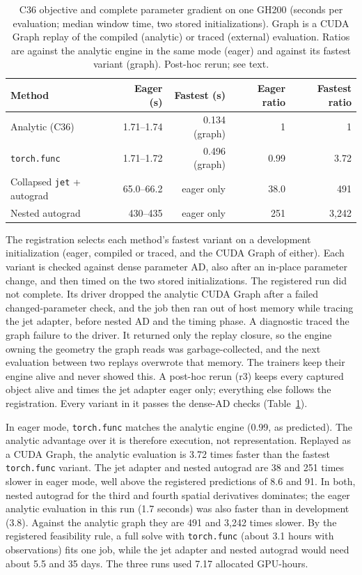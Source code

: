 \documentclass[11pt]{article}
\begin{document}
\begin{table}[htbp]\centering\small
\caption{C36 objective and complete parameter gradient on one GH200 (seconds
per evaluation; median window time, two stored initializations). Graph is a
CUDA Graph replay of the compiled (analytic) or traced (external) evaluation.
Ratios are against the analytic engine in the same mode (eager) and against
its fastest variant (graph). Post-hoc rerun; see text.}
\label{tab:c36external}
\begin{tabular}{lrrrr}\toprule
Method & Eager (s) & Fastest (s) & Eager ratio & Fastest ratio\\\midrule
Analytic (C36) & 1.71--1.74 & 0.134 (graph) & 1 & 1\\
\texttt{torch.func} & 1.71--1.72 & 0.496 (graph) & 0.99 & 3.72\\
Collapsed \texttt{jet} + autograd & 65.0--66.2 & eager only & 38.0 & 491\\
Nested autograd & 430--435 & eager only & 251 & 3,242
\\\bottomrule\end{tabular}
\end{table}

The registration selects each method's fastest variant on a development
initialization (eager, compiled or traced, and the CUDA Graph of either). Each
variant is checked against dense parameter AD, also after an in-place parameter
change, and then timed on the two stored initializations. The registered run
did not complete. Its driver dropped the analytic CUDA Graph after a failed
changed-parameter check, and the job then ran out of host memory while tracing
the jet adapter, before nested AD and the timing phase. A diagnostic traced
the graph failure to the driver. It returned only the replay closure, so the
engine owning the geometry the graph reads was garbage-collected, and the next
evaluation between two replays overwrote that memory. The trainers keep their
engine alive and never showed this. A post-hoc rerun (r3) keeps every captured
object alive and times the jet adapter eager only; everything else follows the
registration. Every variant in it passes the dense-AD checks
(Table~\ref{tab:c36external}).

In eager mode, \texttt{torch.func} matches the analytic engine (0.99, as
predicted). The analytic advantage over it is therefore execution, not
representation. Replayed as a CUDA Graph, the analytic evaluation is 3.72
times faster than the fastest \texttt{torch.func} variant. The jet adapter and
nested autograd are 38 and 251 times slower in eager mode, well above the
registered predictions of 8.6 and 91. In both, nested autograd for the third
and fourth spatial derivatives dominates; the eager analytic evaluation in
this run (1.7 seconds) was also faster than in development (3.8). Against the
analytic graph they are 491 and 3,242 times slower. By the registered
feasibility rule, a full solve with \texttt{torch.func} (about 3.1 hours with
observations) fits one job, while the jet adapter and nested autograd would
need about 5.5 and 35 days. The three runs used 7.17 allocated GPU-hours.
\end{document}
